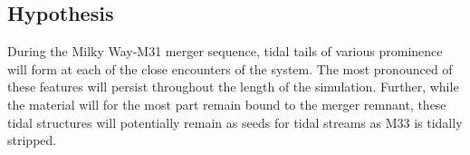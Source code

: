 \documentclass[fleqn,usenatbib]{mnras}
\begin{document}
\subsection{Hypothesis}

During the Milky Way-M31 merger sequence, tidal tails of various prominence will form at each of the close encounters of the system. 
The most pronounced of these features will persist throughout the length of the simulation. 
Further, while the material will for the most part remain bound to the merger remnant, these tidal structures will potentially remain as seeds for tidal streams as M33 is tidally stripped.



 

\bsp	%
\label{lastpage}
\end{document}

